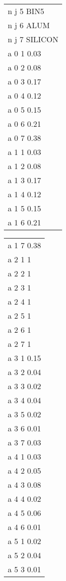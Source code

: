 \begin{center}
\begin{tabular}{l@{\hspace*{50pt}}}
n j 5 BIN5        \\
n j 6 ALUM        \\
n j 7 SILICON     \\
a 0 1 0.03        \\
a 0 2 0.08        \\
a 0 3 0.17        \\
a 0 4 0.12        \\
a 0 5 0.15        \\
a 0 6 0.21        \\
a 0 7 0.38        \\
a 1 1 0.03        \\
a 1 2 0.08        \\
a 1 3 0.17        \\
a 1 4 0.12        \\
a 1 5 0.15        \\
a 1 6 0.21        \\
\end{tabular}
\begin{tabular}{|@{\hspace*{80pt}}l}
a 1 7 0.38        \\
a 2 1 1           \\
a 2 2 1           \\
a 2 3 1           \\
a 2 4 1           \\
a 2 5 1           \\
a 2 6 1           \\
a 2 7 1           \\
a 3 1 0.15        \\
a 3 2 0.04        \\
a 3 3 0.02        \\
a 3 4 0.04        \\
a 3 5 0.02        \\
a 3 6 0.01        \\
a 3 7 0.03        \\
a 4 1 0.03        \\
a 4 2 0.05        \\
a 4 3 0.08        \\
a 4 4 0.02        \\
a 4 5 0.06        \\
a 4 6 0.01        \\
a 5 1 0.02        \\
a 5 2 0.04        \\
a 5 3 0.01        \\

\end{tabular}
\end{center}
